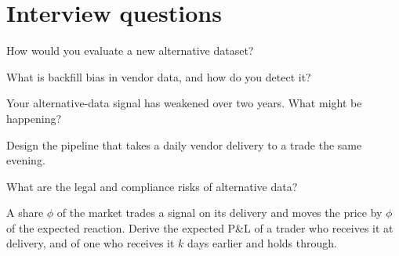 \section{Interview questions}

\begin{interviewq}\label{iq:s1:alternative-data-strategies:1}
How would you evaluate a new alternative dataset?
\end{interviewq}

\begin{interviewq}\label{iq:s1:alternative-data-strategies:2}
What is backfill bias in vendor data, and how do you detect it?
\end{interviewq}

\begin{interviewq}\label{iq:s1:alternative-data-strategies:3}
Your alternative-data signal has weakened over two years. What might be happening?
\end{interviewq}

\begin{interviewq}\label{iq:s1:alternative-data-strategies:4}
Design the pipeline that takes a daily vendor delivery to a trade the same evening.
\end{interviewq}

\begin{interviewq}\label{iq:s1:alternative-data-strategies:5}
What are the legal and compliance risks of alternative data?
\end{interviewq}

\begin{interviewq}\label{iq:s1:alternative-data-strategies:6}
A share $\phi$ of the market trades a signal on its delivery and moves the price by $\phi$ of the expected reaction. Derive the expected P\&L of a trader who
receives it at delivery, and of one who receives it $k$ days earlier and holds through.
\end{interviewq}
